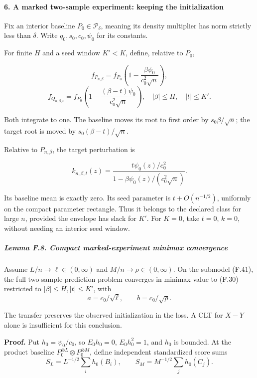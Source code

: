 \paragraph{6. A marked two-sample experiment: keeping the
initialization}\label{a-marked-two-sample-experiment-keeping-the-initialization}

Fix an interior baseline \(P_0\in\mathcal P_\delta\), meaning its
density multiplier has norm strictly less than \(\delta\). Write
\(q_0,s_0,c_0,\psi_0\) for its constants.

For finite \(H\) and a seed window \(K'<K\), define, relative to
\(P_0\),

\[
f_{P_{n,\beta}}
=f_{P_0}\left(1-\frac{\beta\psi_0}{c_0^2\sqrt n}\right),
\] \[
f_{Q_{n,\beta,t}}
=f_{P_0}\left(1-\frac{(\beta-t)\psi_0}{c_0^2\sqrt n}\right),
\quad |\beta|\le H,\quad |t|\le K'.
\tag{F.41}
\]

Both integrate to one. The baseline moves its root to first order by
\(s_0\beta/\sqrt n\); the target root is moved by
\(s_0(\beta-t)/\sqrt n\).

Relative to \(P_{n,\beta}\), the target perturbation is

\[
k_{n,\beta,t}(z)
=
\frac{t\psi_0(z)/c_0^2}
 {1-\beta\psi_0(z)/(c_0^2\sqrt n)}.
\tag{F.42}
\]

Its baseline mean is exactly zero. Its seed parameter is
\(t+O(n^{-1/2})\), uniformly on the compact parameter rectangle. Thus it
belongs to the declared class for large \(n\), provided the envelope has
slack for \(K'\). For \(K=0\), take \(t=0\), \(k=0\), without needing an
interior seed window.

\subparagraph{Lemma F.8. Compact marked-experiment minimax
convergence}\label{lemma-f.8.-compact-marked-experiment-minimax-convergence}

Assume \(L/n\to\ell\in(0,\infty)\) and \(M/n\to\rho\in(0,\infty)\). On
the submodel (F.41), the full two-sample prediction problem converges in
minimax value to (F.30) restricted to \(|\beta|\le H,|t|\le K'\), with
\[
a=c_0/\sqrt\ell,\qquad b=c_0/\sqrt\rho.
\tag{F.43}
\]

The transfer preserves the observed initialization in the loss. A CLT
for \(X-Y\) alone is insufficient for this conclusion.

\textbf{Proof.} Put \(h_0=\psi_0/c_0\), so \(E_0h_0=0\), \(E_0h_0^2=1\),
and \(h_0\) is bounded. At the product baseline
\(P_0^{\otimes L}\otimes P_0^{\otimes M}\), define independent
standardized score sums \[
S_L=L^{-1/2}\sum_i h_0(B_i),\qquad
S_M=M^{-1/2}\sum_j h_0(C_j).
\]


